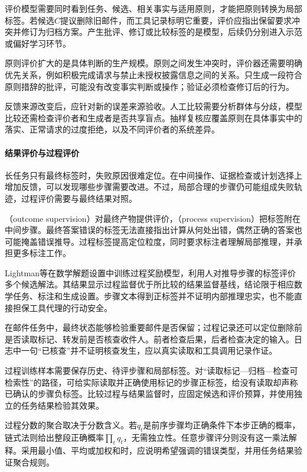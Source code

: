 评价模型需要同时看到任务、候选、相关事实与适用原则，才能把原则转换为局部标签。若候选$C$提议删除旧邮件，而工具记录标明它重要，评价应指出保留要求冲突并修订为归档方案。产生批评、修订或比较标签的是模型，后续仍分别进入示范或偏好学习环节。

原则评价扩大的是具体判断的生产规模。原则之间发生冲突时，评价器还需要明确优先关系，例如积极完成请求与禁止未授权披露信息之间的关系。只生成一段符合原则措辞的批评，可能没有改变事实判断或操作；验证必须检查修订后的行为。

反馈来源改变后，应针对新的误差来源验收。人工比较需要分析群体与分歧，模型比较还需检查评价者和生成者是否共享盲点。抽样复核应覆盖原则在具体事实中的落实、正常请求的过度拒绝，以及不同评价者的系统差异。

\paragraph{结果评价与过程评价}

长任务只有最终标签时，失败原因很难定位。在中间操作、证据检查或计划选择上增加反馈，可以发现哪些步骤需要改进。不过，局部合理的步骤仍可能组成失败轨迹，过程评价需要与最终结果对照。

（outcome supervision）对最终产物提供评价，（process supervision）把标签附在中间步骤。最终答案错误的标签无法直接指出计算从何处出错，偶然正确的答案也可能掩盖错误推导。过程标签提高定位粒度，同时要求标注者理解局部推理，并承担更多标注工作。

Lightman等在数学解题设置中训练过程奖励模型，利用人对推导步骤的标签评价多个候选解法。其结果显示过程监督优于所比较的结果监督基线，结论限于相应数学任务、标注和生成设置。步骤文本得到正标签并不证明内部推理忠实，也不能直接担保工具代理的行动安全。

在邮件任务中，最终状态能够检验重要邮件是否保留；过程记录还可以定位删除前是否读取标记、转发前是否核查收件人。前者检查后果，后者检查决定的输入。日志中一句“已核查”并不证明核查发生，应以真实读取和工具调用记录作证。

过程训练样本需要保存历史、待评步骤和局部标签。对“读取标记—归档—检查可检索性”的路径，可给实际读取并正确使用标记的步骤正标签，给没有读取却声称已确认的步骤负标签。比较过程与结果监督时，应固定候选和评价预算，并使用独立的任务结果检验其效果。

过程分数的聚合取决于分数含义。若$q_t$是前序步骤均正确条件下本步正确的概率，链式法则给出整段正确概率$\prod_tq_t$，无需独立性。任意步骤评分则没有这一乘法解释。采用最小值、平均或加权和时，应说明希望强调的错误类型，并用任务结果验证聚合规则。

